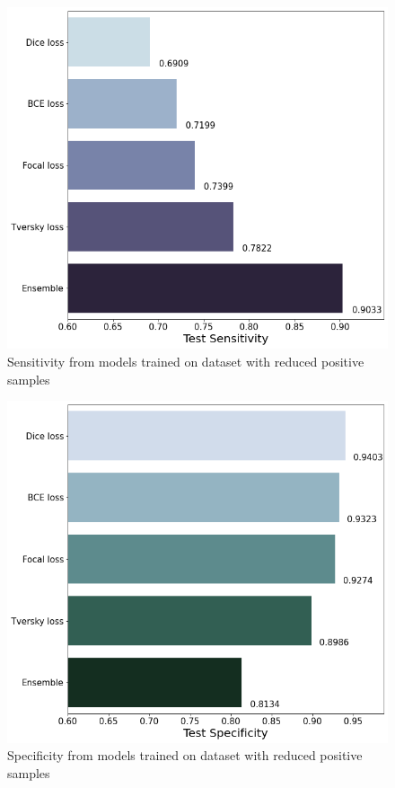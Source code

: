 \documentclass[conference]{IEEEtran}
\begin{document}
\begin{figure}[tp]
  \centering
  \includegraphics[scale=0.2]{undersampled_data_sensitivity.png}
  \caption{Sensitivity from models trained on dataset with reduced positive samples}
  \label{undersampled_data_sensitivity}
\end{figure}
\begin{figure}[tp]
  \centering
  \includegraphics[scale=0.2]{undersampled_data_specificity.png}
  \caption{Specificity from models trained on dataset with reduced positive samples}
  \label{undersampled_data_specificity}
\end{figure}
\end{document}
